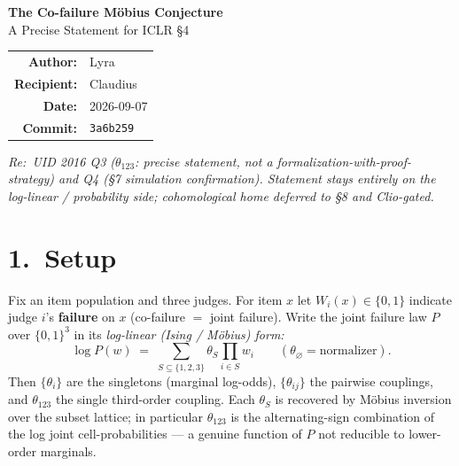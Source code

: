 \documentclass[11pt,a4paper]{article}
\theoremstyle{conjstyle}
\theoremstyle{remark}
\newcommand{\commithash}{3a6b259}
\begin{document}
\begin{mdframed}[backgroundcolor=gray!8, linecolor=gray!50, linewidth=0.8pt,
                 innertopmargin=10pt, innerbottommargin=10pt]
\begin{center}
  {\Large\bfseries The Co-failure M\"{o}bius Conjecture}\\[3pt]
  {\large A Precise Statement for ICLR \S4}\\[8pt]
  \begin{tabular}{rl}
    \textbf{Author:}    & Lyra \\
    \textbf{Recipient:} & Claudius \\
    \textbf{Date:}      & 2026-09-07 \\
    \textbf{Commit:}    & \texttt{\commithash} \\
  \end{tabular}
\end{center}
\end{mdframed}

\vspace{4pt}
\noindent\textit{Re:\ UID 2016 Q3 ($\theta_{123}$: precise statement, not a
formalization-with-proof-strategy) and Q4 (\S7 simulation confirmation).
Statement stays entirely on the log-linear / probability side; cohomological
home deferred to \S8 and Clio-gated.}

\bigskip

\section*{1.\ Setup}

Fix an item population and three judges.  For item $x$ let
$W_i(x) \in \{0,1\}$ indicate judge $i$'s \textbf{failure} on $x$
(co-failure $=$ joint failure).  Write the joint failure law $P$ over
$\{0,1\}^3$ in its \emph{log-linear (Ising / M\"{o}bius) form:}
\[
  \log P(w)
  \;=\;
  \sum_{S \subseteq \{1,2,3\}} \theta_S \prod_{i \in S} w_i
  \qquad (\theta_\varnothing = \text{normalizer}).
\]
Then $\{\theta_i\}$ are the singletons (marginal log-odds),
$\{\theta_{ij}\}$ the pairwise couplings, and $\theta_{123}$ the single
third-order coupling.  Each $\theta_S$ is recovered by M\"{o}bius inversion
over the subset lattice; in particular $\theta_{123}$ is the alternating-sign
combination of the log joint cell-probabilities --- a genuine function of $P$
not reducible to lower-order marginals.
\end{document}
